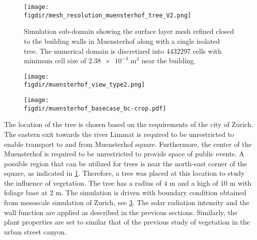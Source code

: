 
\begin{figure}[p]
	\centering
	\texttt{[image: \\figdir/mesh\_resolution\_muensterhof\_tree\_V2.png]}
	\caption{Simulation sub-domain showing the surface layer mesh refined closed to the building walls in Muensterhof along with a single isolated tree. The numerical domain is discretized into $\num{4432297}$ cells with minimum cell size of $\num{2.38e-3}$ m$^{3}$ near the building.}
	\label{fig:mesh_resolution_muensterhof_tree}
\end{figure}

\begin{figure}[t]
	\centering
	\texttt{[image: \\figdir/muensterhof\_view\_type2.png]}
	\caption{}
	\label{fig:muensterhof_view}
\end{figure}

\begin{figure}[p]
	\centering
	\texttt{[image: \\figdir/muensterhof\_basecase\_bc-crop.pdf]}
	\caption{}
	\label{fig:muensterhof_bc}
\end{figure}



The location of the tree is chosen based on the requirements of the city of Zurich. The eastern exit towards the river Limmat is required to be unrestricted to enable transport to and from Muensterhof square. Furthermore, the center of the Muensterhof is required to be unrestricted to provide space of public events. A possible region that can be utilized for trees is near the north-east corner of the square, as indicated in \cref{fig:mesh_resolution_muensterhof_tree}. Therefore, a tree was placed at this location to study the influence of vegetation. The tree has a radius of $4$ m and a high of $10$ m with foliage base at $2$ m. The simulation is driven with boundary condition obtained from mesoscale simulation of Zurich, see \cref{fig:muensterhof_bc}. The solar radiation intensity and the wall function are applied as described in the previous sections. Similarly, the plant properties are set to similar that of the previous study of vegetation in the urban street canyon. 

